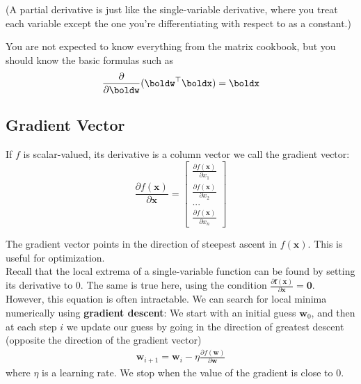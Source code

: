 \documentclass[12pt,letterpaper]{article}
\newcommand{\p}{\partial}
\newcommand{\1}{\mathbbm{1}}
\begin{document}
\noindent 
(A partial derivative is just like the single-variable derivative, where you treat each variable except the one you're differentiating with respect to as a constant.)

You are not expected to know everything from the matrix cookbook, but you should know the basic formulas such as
$$\frac{\partial}{\partial \boldw} (\boldw^\top \boldx) = \boldx$$

\subsection{Gradient Vector}
If $f$ is scalar-valued, its derivative is a column vector we call the gradient vector:
$$
     \frac{\partial f(\mathbf{x})}{\partial \mathbf{x}}=\begin{bmatrix}
         \frac{\p f(\mathbf{x})}{\p x_1} \\
         \frac{\p f(\mathbf{x})}{\p x_2} \\
         ... \\
         \frac{\p f(\mathbf{x})}{\p x_n}
        \end{bmatrix}
$$

\noindent 
The gradient vector points in the direction of steepest ascent in $f(\mathbf{x})$. This is useful for optimization.\\

\noindent 
Recall that the local extrema of a single-variable function can be found by setting its derivative to 0. The same is true here, using the condition $\frac{\partial\mathbf{f}(\mathbf{x})}{\partial \mathbf{x}}=\mathbf{0}$. 
However, this equation is often intractable. We can search for local minima numerically using \textbf{gradient descent}:
We start with an initial guess $\mathbf{w}_0$, and then at each step $i$ we update our guess by going in the direction of greatest descent (opposite the direction of the gradient vector)
\begin{align*}
\mathbf{w}_{i+1} = \mathbf{w}_i - \eta \frac{\partial f(\mathbf{w})}{\partial \mathbf{w}}
\end{align*}
where $\eta$ is a learning rate. We stop when the value of the gradient is close to 0. 



\end{document}
